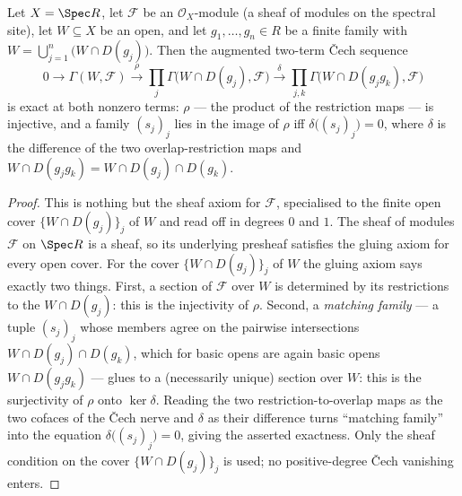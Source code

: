 \begin{lemma}
  \label{mk-lem:qcoh_section_equalizer}

  Let \(X = \Spec R\), let \(\mathcal{F}\) be an \(\mathcal{O}_X\)-module (a sheaf of modules on the
  spectral site), let \(W \subseteq X\) be an open, and let \(g_1, \ldots, g_n \in R\) be a finite family
  with \(W = \bigcup_{j=1}^{n} \bigl(W \cap D(g_j)\bigr)\). Then the augmented two-term {\v C}ech sequence
  \[
    0 \longrightarrow \Gamma(W, \mathcal{F})
      \xrightarrow{\ \rho\ } \prod_{j} \Gamma\bigl(W \cap D(g_j), \mathcal{F}\bigr)
      \xrightarrow{\ \delta\ } \prod_{j,k} \Gamma\bigl(W \cap D(g_j g_k), \mathcal{F}\bigr)
  \]
  is exact at both nonzero terms: \(\rho\) — the product of the restriction maps — is injective, and a
  family \((s_j)_j\) lies in the image of \(\rho\) iff \(\delta\bigl((s_j)_j\bigr) = 0\), where
  \(\delta\) is the difference of the two overlap-restriction maps and
  \(W \cap D(g_j g_k) = W \cap D(g_j) \cap D(g_k)\).
\end{lemma}
\begin{proof}

  This is nothing but the sheaf axiom for \(\mathcal{F}\), specialised to the finite open cover
  \(\{W \cap D(g_j)\}_{j}\) of \(W\) and read off in degrees \(0\) and \(1\). The sheaf of modules
  \(\mathcal{F}\) on \(\Spec R\) is a sheaf, so its underlying presheaf satisfies the gluing axiom for
  every open cover. For the cover \(\{W \cap D(g_j)\}_j\) of \(W\) the gluing axiom says exactly two
  things. First, a section of \(\mathcal{F}\) over \(W\) is determined by its restrictions to the
  \(W \cap D(g_j)\): this is the injectivity of \(\rho\). Second, a \emph{matching family} — a tuple
  \((s_j)_j\) whose members agree on the pairwise intersections
  \(W \cap D(g_j) \cap D(g_k)\), which for basic opens are again basic opens \(W \cap D(g_j g_k)\) —
  glues to a (necessarily unique) section over \(W\): this is the surjectivity of \(\rho\) onto
  \(\ker \delta\). Reading the two restriction-to-overlap maps as the two cofaces of the {\v C}ech nerve
  and \(\delta\) as their difference turns ``matching family'' into the equation
  \(\delta\bigl((s_j)_j\bigr) = 0\), giving the asserted exactness. Only the sheaf condition on the cover
  \(\{W \cap D(g_j)\}_j\) is used; no positive-degree {\v C}ech vanishing enters.
\end{proof}

